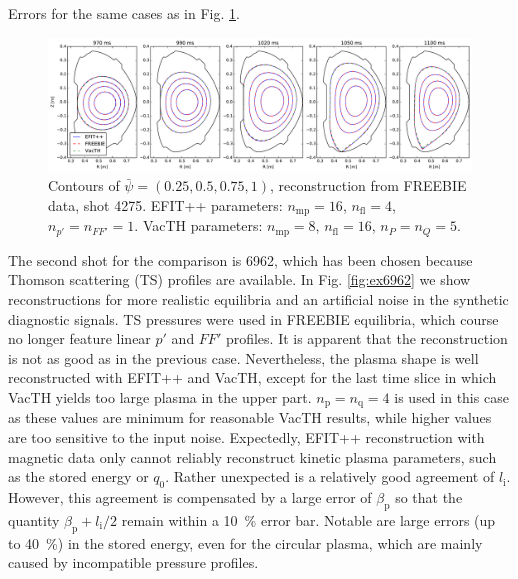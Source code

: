 \begin{table}
\caption{Errors for the same cases as in Fig. \ref{fig:ex4275}.}
\label{table:ex4275}
\end{table}

\begin{figure}
\centering   %
\hfill{}
\includegraphics[width=18cm]{figures/example_4275.pdf}
\hfill{}
\caption{Contours of $\bar\psi=\left(0.25,0.5,0.75,1\right)$, reconstruction from FREEBIE data, shot 4275. EFIT++ parameters: $n_\mathrm{mp} = 16$, $n_\mathrm{fl} = 4$, $n_{p'} = n_{FF'} = 1$. VacTH parameters: $n_\mathrm{mp} = 8$, $n_\mathrm{fl} = 16$, $n_P = n_Q = 5$.}
\label{fig:ex4275}
\end{figure}


The second shot for the comparison is 6962, which has been chosen because Thomson scattering (TS) profiles are available. In Fig. \ref{fig:ex6962} we show reconstructions for more realistic equilibria and an artificial noise in the synthetic diagnostic signals. TS pressures were used in FREEBIE equilibria, which course no longer feature linear $p'$ and $FF'$ profiles. 
It is apparent that the reconstruction is not as good as in the previous case. Nevertheless, the plasma shape is well reconstructed with EFIT++ and VacTH, except for the last time slice in which VacTH yields too large plasma in the upper part.
$n_{\mathrm p} = n_{\mathrm q} = 4$ is used in this case as these values are minimum for reasonable VacTH results, while higher values are too sensitive to the input noise.
Expectedly, EFIT++ reconstruction with magnetic data only cannot reliably reconstruct kinetic plasma parameters, such as the stored energy or $q_0$. Rather unexpected is a relatively good agreement of $l_\mathrm{i}$. However, this agreement is compensated by a large error of $\beta_{\mathrm p}$ so that the quantity $\beta_{\mathrm p} + l_{\mathrm i}/2$ remain within a 10~\% error bar. Notable are large errors (up to 40~\%) in the stored energy, even for the circular plasma, which are mainly caused by incompatible pressure profiles.

